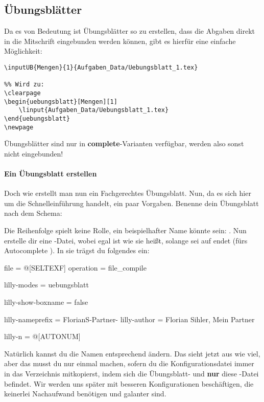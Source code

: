 \clearpage
\subsection{Übungsblätter}
Da es von Bedeutung ist Übungsblätter so zu erstellen, dass die Abgaben direkt in die Mitschrift eingebunden werden können, gibt es hierfür eine einfache Möglichkeit:
\begin{lstlisting}[language=lLatex]
%% \inputUB{<Name>}{<Nummer>}{<Pfad - linput>}
\inputUB{Mengen}{1}{Aufgaben_Data/Uebungsblatt_1.tex}

%% Wird zu:
\clearpage
\begin{uebungsblatt}[Mengen][1]
    \linput{Aufgaben_Data/Uebungsblatt_1.tex}
\end{uebungsblatt}
\newpage
\end{lstlisting}
Übungsblätter sind nur in \textbf{complete}-Varianten verfügbar, werden also sonst nicht eingebunden! \paragraph{Ein Übungsblatt erstellen}
Doch wie erstellt man nun ein Fachgerechtes Übungsblatt. Nun, da es sich hier um die Schnelleinführung handelt, ein paar Vorgaben. Benenne dein Übungsblatt nach dem Schema: \begin{center}
\end{center}
Die Reihenfolge spielt keine Rolle, ein beispielhafter Name könnte sein: \newline{}. Nun erstelle dir eine -Datei, wobei egal ist wie sie heißt, solange sei auf  endet (fürs Autocomplete \Smiley). In sie trägst du folgendes ein:
\begin{gepard}
file        = @[SELTEXF]
operation   = file_compile

lilly-modes = uebungsblatt

lilly-show-boxname = false

lilly-nameprefix = FlorianS-Partner-
lilly-author = Florian Sihler, Mein Partner

lilly-n = @[AUTONUM]
\end{gepard}
Natürlich kannst du die Namen entsprechend ändern. Das sieht jetzt aus wie viel, aber das musst du nur einmal machen, sofern du die Konfigurationsdatei immer in das Verzeichnis mitkopierst, indem sich die Übungsblatt- und \textbf{nur} diese -Datei befindet. Wir werden uns später %
mit besseren Konfigurationen beschäftigen, die keinerlei Nachaufwand benötigen und galanter sind.
